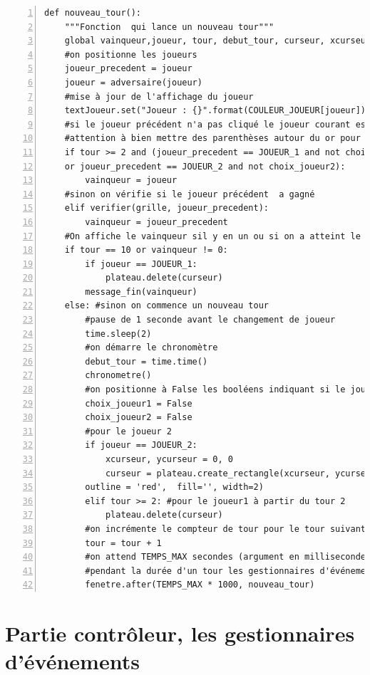 \documentclass[a4paper, french, 12pt]{article}  %
\newcounter{exo}
\newcounter{exoB}
\newenvironment{exerciceB2}
{\par \bigskip  \noindent \addtocounter{exoB}{1} \hrulefill \quad { \large \textbf{Exercice \theexoB}} \quad \hrulefill \par \medskip }
{\par \bigskip }
\newcounter{act}
\newcounter{def}
\begin{document}
\begin{exerciceB2}{}
\begin{enumerate}
\begin{lstlisting}[numbers=left]
def nouveau_tour():
    """Fonction  qui lance un nouveau tour"""
    global vainqueur,joueur, tour, debut_tour, curseur, xcurseur, ycurseur, choix_joueur1, choix_joueur2
    #on positionne les joueurs
    joueur_precedent = joueur
    joueur = adversaire(joueur)
    #mise à jour de l'affichage du joueur
    textJoueur.set("Joueur : {}".format(COULEUR_JOUEUR[joueur]))
    #si le joueur précédent n'a pas cliqué le joueur courant est vainqueur
    #attention à bien mettre des parenthèses autour du or pour changer la priorité par défaut des opérateurs booléens
    if tour >= 2 and (joueur_precedent == JOUEUR_1 and not choix_joueur1 \
    or joueur_precedent == JOUEUR_2 and not choix_joueur2):
        vainqueur = joueur
    #sinon on vérifie si le joueur précédent  a gagné
    elif verifier(grille, joueur_precedent):
        vainqueur = joueur_precedent
    #On affiche le vainqueur sil y en un ou si on a atteint le 10ème tour
    if tour == 10 or vainqueur != 0:
        if joueur == JOUEUR_1:
            plateau.delete(curseur)
        message_fin(vainqueur)
    else: #sinon on commence un nouveau tour
        #pause de 1 seconde avant le changement de joueur
        time.sleep(2)
        #on démarre le chronomètre
        debut_tour = time.time()
        chronometre()
        #on positionne à False les booléens indiquant si le joueur courant a fait son choix
        choix_joueur1 = False
        choix_joueur2 = False
        #pour le joueur 2
        if joueur == JOUEUR_2:
            xcurseur, ycurseur = 0, 0
            curseur = plateau.create_rectangle(xcurseur, ycurseur , xcurseur + COTE_CASE, ycurseur + COTE_CASE,
        outline = 'red',  fill='', width=2)
        elif tour >= 2: #pour le joueur1 à partir du tour 2
            plateau.delete(curseur)
        #on incrémente le compteur de tour pour le tour suivant
        tour = tour + 1
        #on attend TEMPS_MAX secondes (argument en millisecondes) avant de commencer un nouveau tour
        #pendant la durée d'un tour les gestionnaires d'événements gèrent les actions
        fenetre.after(TEMPS_MAX * 1000, nouveau_tour)
\end{lstlisting}

\end{enumerate}

\end{exerciceB2}









\section{Partie contrôleur, les gestionnaires d'événements}
\end{document}
